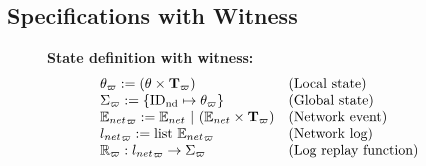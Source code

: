 \subsection{Specifications with Witness} 
\label{chapter:witnesspassing:subsec:specifications-with-witness}

\begin{figure}
\raggedright
\textbf{State definition with witness:}\\
$$
\begin{array}{ll}
\theta_\varpi:= (\theta \times {\textbf{T}_{\varpi}})  & \mbox{(Local state)} \\
\Sigma_\varpi := \{\mathrm{ID_{nd}} \mapsto \theta_\varpi\} & \mbox{(Global state)}\\
{\mathbb{E}_{net}}_\varpi:= {\mathbb{E}_{net}}~\vert~({\mathbb{E}_{net}} \times  {\textbf{T}_{\varpi}}) & \mbox{(Network event)}\\
{{l_{net}}}_{\varpi}:= \mbox{list}\ {\mathbb{E}_{net}}_\varpi & \mbox{(Network log)}\\
\mathbb{R}_\varpi : {{l_{net}}}_{\varpi} \rightarrow  \Sigma_\varpi& \mbox{(Log replay function)}\\
\end{array}
$$


\end{figure}
